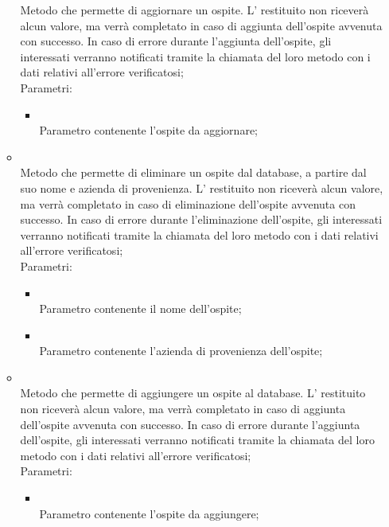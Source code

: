 \begin{itemize}
\begin{itemize}
		Metodo che permette di aggiornare un ospite.  L' restituito non riceverà alcun valore, ma verrà completato in caso di aggiunta dell'ospite avvenuta con successo. In caso di errore durante l'aggiunta dell'ospite, gli  interessati verranno notificati tramite la chiamata del loro metodo  con i dati relativi all'errore verificatosi;\\
		Parametri:
		\begin{itemize}
			\item {} \\
			Parametro contenente l'ospite da aggiornare;
		\end{itemize}
		\item[]  \\
		Metodo che permette di eliminare un ospite dal database, a partire dal suo nome e azienda di provenienza.  L' restituito non riceverà alcun valore, ma verrà completato in caso di eliminazione  dell'ospite avvenuta con successo. In caso di errore durante l'eliminazione dell'ospite, gli  interessati verranno notificati tramite la chiamata del loro metodo  con i dati relativi all'errore verificatosi;\\
		Parametri:
		\begin{itemize}
			\item {} \\
			Parametro contenente il nome dell'ospite;
			\item {} \\
			Parametro contenente l'azienda di provenienza dell'ospite;
		\end{itemize}
		\item[]  \\
		Metodo che permette di aggiungere un ospite al database.  L' restituito non riceverà alcun valore, ma verrà completato in caso di aggiunta dell'ospite avvenuta con successo. In caso di errore durante l'aggiunta dell'ospite, gli  interessati verranno notificati tramite la chiamata del loro metodo  con i dati relativi all'errore verificatosi;\\
		Parametri:
		\begin{itemize}
			\item {} \\
			Parametro contenente l'ospite da aggiungere;

\end{itemize}
\end{itemize}
\end{itemize}
